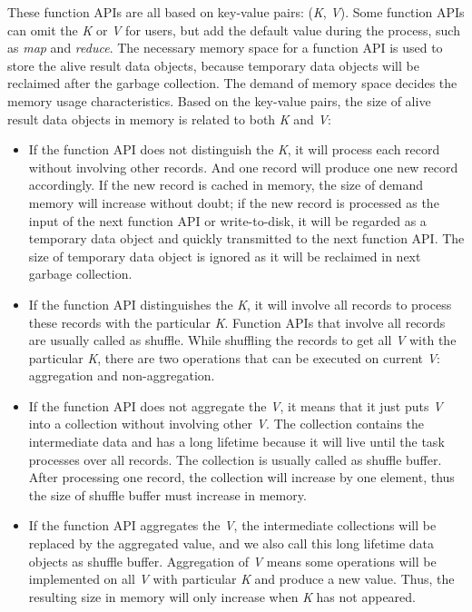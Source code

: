 These function APIs are all based on key-value pairs: (\textit{K}, \textit{V}). Some function APIs can omit the \textit{K} or \textit{V} for users, but add the default value during the process, such as \textit{map} and \textit{reduce}. The necessary memory space for a function API is used to store the alive result data objects, because temporary data objects will be reclaimed after the garbage collection. The demand of memory space decides the memory usage characteristics. Based on the key-value pairs, the size of alive result data objects in memory is related to both \textit{K} and \textit{V}:

\begin{itemize}

\item If the function API does not distinguish the \textit{K}, it will process each record without involving other records. And one record will produce one new record accordingly. If the new record is cached in memory, the size of demand memory will increase without doubt; if the new record is processed as the input of the next function API or write-to-disk, it will be regarded as a temporary data object and quickly transmitted to the next function API. The size of temporary data object is ignored as it will be reclaimed in next garbage collection.

\item If the function API distinguishes the \textit{K}, it will involve all records to process these records with the particular \textit{K}. Function APIs that involve all records are usually called as shuffle. While shuffling the records to get all \textit{V} with the particular \textit{K}, there are two operations that can be executed on current \textit{V}: aggregation and non-aggregation.

\item If the function API does not aggregate the \textit{V}, it means that it just puts \textit{V} into a collection without involving other \textit{V}. The collection contains the intermediate data and has a long lifetime because it will live until the task processes over all records. The collection is usually called as shuffle buffer. After processing one record, the collection will increase by one element, thus the size of shuffle buffer must increase in memory.

\item If the function API aggregates the \textit{V}, the intermediate collections will be replaced by the aggregated value, and we also call this long lifetime data objects as shuffle buffer. Aggregation of \textit{V} means some operations will be implemented on all \textit{V} with particular \textit{K} and produce a new value. Thus, the resulting size in memory will only increase when \textit{K} has not appeared.

\end{itemize}


